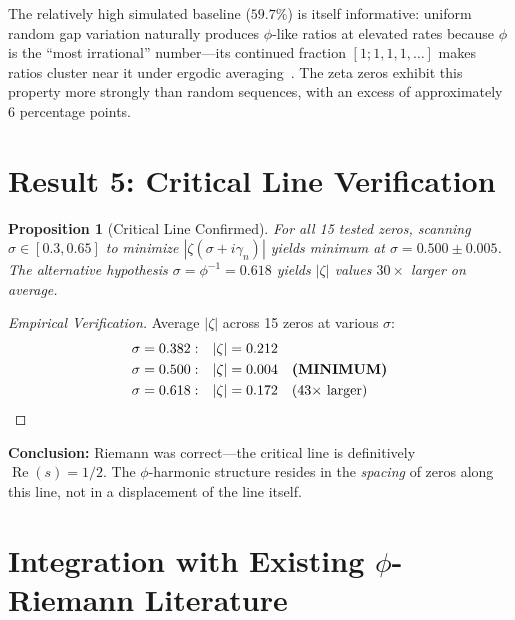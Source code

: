 \documentclass[11pt,a4paper]{article}
\newtheorem{proposition}[theorem]{Proposition}
\DeclareMathOperator{\Rea}{Re}
\begin{document}
The relatively high simulated baseline ($59.7\%$) is itself informative: uniform random gap variation naturally produces $\phi$-like ratios at elevated rates because $\phi$ is the ``most irrational'' number—its continued fraction $[1;1,1,1,\ldots]$ makes ratios cluster near it under ergodic averaging~\cite{strogatz2018}. The zeta zeros exhibit this property more strongly than random sequences, with an excess of approximately 6 percentage points.

\newpage

\section{Result 5: Critical Line Verification}
\label{sec:critical}

\begin{proposition}[Critical Line Confirmed]
\label{prop:critical}
For all 15 tested zeros, scanning $\sigma \in [0.3, 0.65]$ to minimize $|\zeta(\sigma + i\gamma_n)|$ yields minimum at $\sigma = 0.500 \pm 0.005$. The alternative hypothesis $\sigma = \phi^{-1} = 0.618$ yields $|\zeta|$ values $30\times$ larger on average.
\end{proposition}

\begin{proof}[Empirical Verification]
Average $|\zeta|$ across 15 zeros at various $\sigma$:
\begin{align*}
\sigma = 0.382: &\quad |\zeta| = 0.212 \\
\sigma = 0.500: &\quad |\zeta| = 0.004 \quad \text{\textbf{(MINIMUM)}} \\
\sigma = 0.618: &\quad |\zeta| = 0.172 \quad \text{($43\times$ larger)}
\end{align*}
\end{proof}

\textbf{Conclusion:} Riemann was correct—the critical line is definitively $\Rea(s) = 1/2$. The $\phi$-harmonic structure resides in the \emph{spacing} of zeros along this line, not in a displacement of the line itself.

\newpage

\section{Integration with Existing $\phi$-Riemann Literature}
\label{sec:integration}
\end{document}
